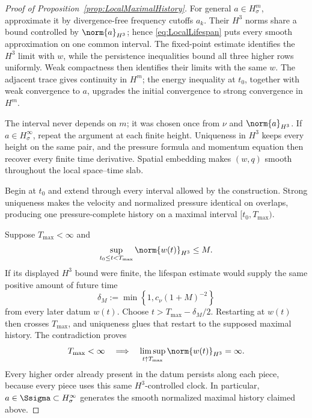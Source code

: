 \begin{proof}[Proof of Proposition~\ref{prop:LocalMaximalHistory}]
For general \(a\in H^m_\sigma\), approximate it by divergence-free frequency
cutoffs \(a_k\).  Their \(H^3\) norms share a bound controlled by
\(\norm{a}_{H^3}\); hence \eqref{eq:LocalLifespan} puts every smooth
approximation on one common interval.  The fixed-point estimate identifies the
\(H^3\) limit with \(w\), while the persistence inequalities bound all three
higher rows uniformly.  Weak compactness then identifies their limits with the
same \(w\).  The adjacent trace gives continuity in \(H^m\); the energy
inequality at \(t_0\), together with weak convergence to \(a\), upgrades the
initial convergence to strong convergence in \(H^m\).

The interval never depends on \(m\); it was chosen once from \(\nu\) and
\(\norm{a}_{H^3}\).  If \(a\in H^\infty_\sigma\), repeat the argument at each
finite height.  Uniqueness in \(H^3\) keeps every height on the same pair, and
the pressure formula and momentum equation then recover every finite time
derivative.  Spatial embedding makes \((w,q)\) smooth throughout the local
space--time slab.


Begin at \(t_0\) and extend through every interval allowed by the construction.
Strong uniqueness makes the velocity and normalized pressure identical on
overlaps, producing one pressure-complete history on a maximal interval
\([t_0,T_{\max})\).

Suppose \(T_{\max}<\infty\) and
\[
  \sup_{t_0\leq t<T_{\max}}\norm{w(t)}_{H^3}\leq M.
\]
If its displayed \(H^3\) bound were finite, the lifespan estimate would supply
the same positive amount of future time
\[
  \delta_M
  :=\min\left\{1,c_\nu(1+M)^{-2}\right\}
\]
from every later datum \(w(t)\).  Choose
\(t>T_{\max}-\delta_M/2\).  Restarting at \(w(t)\) then crosses
\(T_{\max}\), and uniqueness glues that restart to the supposed maximal
history.  The contradiction proves
\begin{equation}
  T_{\max}<\infty
  \quad\Longrightarrow\quad
  \limsup_{t\uparrow T_{\max}}\norm{w(t)}_{H^3}=\infty.
  \label{eq:LocalContinuationAlternative}
\end{equation}
Every higher order already present in the datum persists along each piece,
because every piece uses this same \(H^3\)-controlled clock.  In particular,
\(a\in\Ssigma\subset H^\infty_\sigma\) generates the smooth normalized maximal
history claimed above.
\end{proof}
